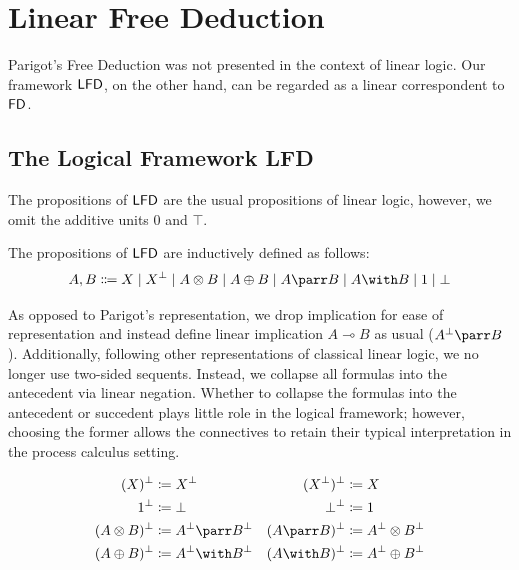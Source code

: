\chapter{Linear Free Deduction}\label{ch:linear-fd}

Parigot's Free Deduction was not presented in the context of linear logic.
Our framework $\textsf{LFD}$, on the other hand, can be regarded as a linear correspondent
to $\textsf{FD}$.

\section{The Logical Framework LFD}
The propositions of $\textsf{LFD}$ are the usual propositions
of linear logic, however, we omit the additive units $0$ and $\top$.

\begin{definition}[Propositions]
  The propositions of $\textsf{LFD}$ are inductively defined as follows:
  \[
    A, B \Coloneqq X
              \mid X^\bot
              \mid A \otimes B
              \mid A \oplus B
              \mid A \parr B
              \mid A \with B
              \mid 1
              \mid \bot
  \]
\end{definition}

As opposed to Parigot's representation, we drop implication for ease of
representation and instead define linear implication $A \multimap B$ as usual ($A^\bot \parr B$).
Additionally, following other representations of classical linear logic, we no longer
use two-sided sequents. Instead, we collapse all formulas into the antecedent
via linear negation. Whether to collapse the formulas into the antecedent or
succedent plays little role in the logical framework; however, choosing
the former allows the connectives to retain their typical interpretation
in the process calculus setting.

\begin{definition} \label{def:lfd:linear-negation}
  \begin{align*}
    (X)^\bot &\coloneq X^\bot
    & (X^\bot)^\bot &\coloneq X \\
    1^\bot &\coloneq \bot
    & \bot^\bot &\coloneq 1 \\
    (A \otimes B)^\bot &\coloneq A^\bot \parr B^\bot
    & (A \parr B)^\bot &\coloneq A^\bot \otimes B^\bot \\
    (A \oplus B)^\bot &\coloneq A^\bot \with B^\bot
    & (A \with B)^\bot &\coloneq A^\bot \oplus B^\bot
  \end{align*}
\end{definition}

